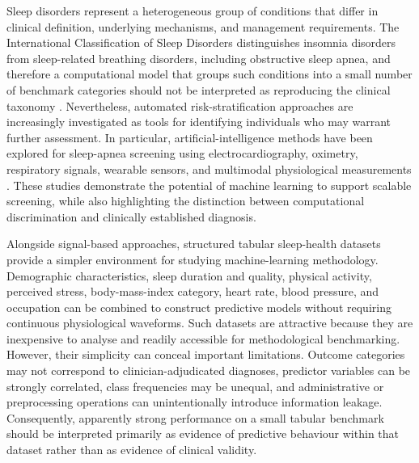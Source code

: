 \documentclass[a4paper,fleqn]{cas-dc}
\begin{document}
Sleep disorders represent a heterogeneous group of conditions that differ in clinical definition, underlying mechanisms, and management requirements. The International Classification of Sleep Disorders distinguishes insomnia disorders from sleep-related breathing disorders, including obstructive sleep apnea, and therefore a computational model that groups such conditions into a small number of benchmark categories should not be interpreted as reproducing the clinical taxonomy \cite{aasm2023}. Nevertheless, automated risk-stratification approaches are increasingly investigated as tools for identifying individuals who may warrant further assessment. In particular, artificial-intelligence methods have been explored for sleep-apnea screening using electrocardiography, oximetry, respiratory signals, wearable sensors, and multimodal physiological measurements \cite{bazoukis2023,tyagi2023,abdalrazaq2024,giorgi2025}. These studies demonstrate the potential of machine learning to support scalable screening, while also highlighting the distinction between computational discrimination and clinically established diagnosis.

Alongside signal-based approaches, structured tabular sleep-health datasets provide a simpler environment for studying machine-learning methodology. Demographic characteristics, sleep duration and quality, physical activity, perceived stress, body-mass-index category, heart rate, blood pressure, and occupation can be combined to construct predictive models without requiring continuous physiological waveforms. Such datasets are attractive because they are inexpensive to analyse and readily accessible for methodological benchmarking. However, their simplicity can conceal important limitations. Outcome categories may not correspond to clinician-adjudicated diagnoses, predictor variables can be strongly correlated, class frequencies may be unequal, and administrative or preprocessing operations can unintentionally introduce information leakage. Consequently, apparently strong performance on a small tabular benchmark should be interpreted primarily as evidence of predictive behaviour within that dataset rather than as evidence of clinical validity.
\end{document}
